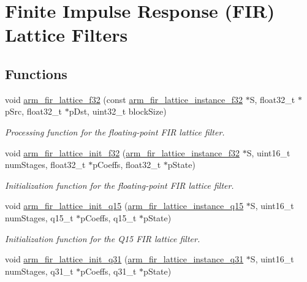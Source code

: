 \hypertarget{group___f_i_r___lattice}{\section{Finite Impulse Response (F\-I\-R) Lattice Filters}
\label{group___f_i_r___lattice}
}
\subsection*{Functions}
\begin{DoxyCompactItemize}
\item 
void \hyperlink{group___f_i_r___lattice_gae63a45a63a11a65f2eae8b8b1fe370a8}{arm\-\_\-fir\-\_\-lattice\-\_\-f32} (const \hyperlink{structarm__fir__lattice__instance__f32}{arm\-\_\-fir\-\_\-lattice\-\_\-instance\-\_\-f32} $\ast$S, float32\-\_\-t $\ast$p\-Src, float32\-\_\-t $\ast$p\-Dst, uint32\-\_\-t block\-Size)
\begin{DoxyCompactList}\small\item\em Processing function for the floating-\/point F\-I\-R lattice filter. \end{DoxyCompactList}\item 
void \hyperlink{group___f_i_r___lattice_ga86199a1590af2b8941c6532ee9d03229}{arm\-\_\-fir\-\_\-lattice\-\_\-init\-\_\-f32} (\hyperlink{structarm__fir__lattice__instance__f32}{arm\-\_\-fir\-\_\-lattice\-\_\-instance\-\_\-f32} $\ast$S, uint16\-\_\-t num\-Stages, float32\-\_\-t $\ast$p\-Coeffs, float32\-\_\-t $\ast$p\-State)
\begin{DoxyCompactList}\small\item\em Initialization function for the floating-\/point F\-I\-R lattice filter. \end{DoxyCompactList}\item 
void \hyperlink{group___f_i_r___lattice_ga1b22f30ce1cc19bf5a5d7c9fca154d72}{arm\-\_\-fir\-\_\-lattice\-\_\-init\-\_\-q15} (\hyperlink{structarm__fir__lattice__instance__q15}{arm\-\_\-fir\-\_\-lattice\-\_\-instance\-\_\-q15} $\ast$S, uint16\-\_\-t num\-Stages, q15\-\_\-t $\ast$p\-Coeffs, q15\-\_\-t $\ast$p\-State)
\begin{DoxyCompactList}\small\item\em Initialization function for the Q15 F\-I\-R lattice filter. \end{DoxyCompactList}\item 
void \hyperlink{group___f_i_r___lattice_gac05a17a0188bb851b58d19e572870a54}{arm\-\_\-fir\-\_\-lattice\-\_\-init\-\_\-q31} (\hyperlink{structarm__fir__lattice__instance__q31}{arm\-\_\-fir\-\_\-lattice\-\_\-instance\-\_\-q31} $\ast$S, uint16\-\_\-t num\-Stages, q31\-\_\-t $\ast$p\-Coeffs, q31\-\_\-t $\ast$p\-State)

\end{DoxyCompactItemize}
